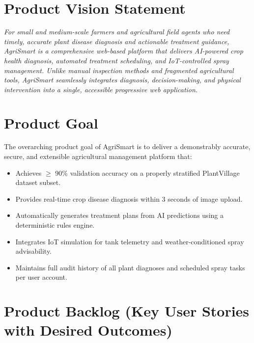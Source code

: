 \documentclass[12pt,a4paper]{report}
\begin{document}
\section{Product Vision Statement}
\textit{For small and medium-scale farmers and agricultural field agents who need timely, accurate plant disease diagnosis and actionable treatment guidance, AgriSmart is a comprehensive web-based platform that delivers AI-powered crop health diagnosis, automated treatment scheduling, and IoT-controlled spray management. Unlike manual inspection methods and fragmented agricultural tools, AgriSmart seamlessly integrates diagnosis, decision-making, and physical intervention into a single, accessible progressive web application.}

\section{Product Goal}
The overarching product goal of AgriSmart is to deliver a demonstrably accurate, secure, and extensible agricultural management platform that:

\begin{itemize}[leftmargin=*]
  \item Achieves $\geq$ 90\% validation accuracy on a properly stratified PlantVillage dataset subset.
  \item Provides real-time crop disease diagnosis within 3 seconds of image upload.
  \item Automatically generates treatment plans from AI predictions using a deterministic rules engine.
  \item Integrates IoT simulation for tank telemetry and weather-conditioned spray advisability.
  \item Maintains full audit history of all plant diagnoses and scheduled spray tasks per user account.
\end{itemize}

\section{Product Backlog (Key User Stories with Desired Outcomes)}
\end{document}
